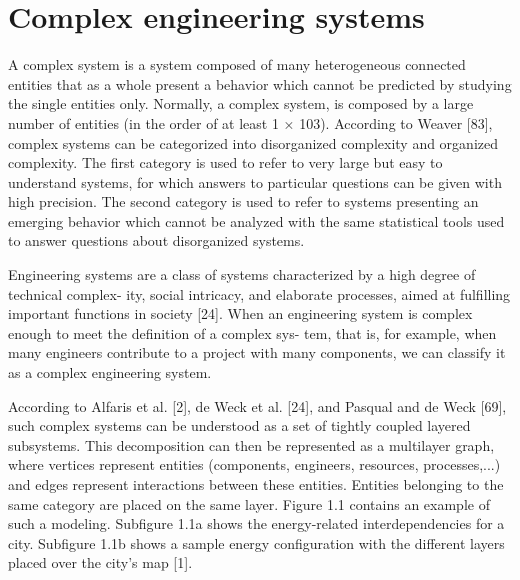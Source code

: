 
\section{Complex engineering systems}

A complex system is a system composed of many heterogeneous connected entities that as a whole present a behavior which cannot be predicted by studying the single entities only. Normally, a complex system, is composed by a large number of entities (in the order of at least 1 × 103). According to Weaver [83], complex systems can be categorized into disorganized complexity and organized complexity. The first category is used to refer to very large but easy to understand systems, for which answers to particular questions can be given with high precision. The second category is used to refer to systems presenting an emerging behavior which cannot be analyzed with the same statistical tools used to answer questions about disorganized systems.

Engineering systems are a class of systems characterized by a high degree of technical complex- ity, social intricacy, and elaborate processes, aimed at fulfilling important functions in society [24]. When an engineering system is complex enough to meet the definition of a complex sys- tem, that is, for example, when many engineers contribute to a project with many components, we can classify it as a complex engineering system.

According to Alfaris et al. [2], de Weck et al. [24], and Pasqual and de Weck [69], such complex systems can be understood as a set of tightly coupled layered subsystems. This decomposition can then be represented as a multilayer graph, where vertices represent entities (components, engineers, resources, processes,...) and edges represent interactions between these entities. Entities belonging to the same category are placed on the same layer. Figure 1.1 contains an example of such a modeling. Subfigure 1.1a shows the energy-related interdependencies for a city. Subfigure 1.1b shows a sample energy configuration with the different layers placed over the city’s map [1].

